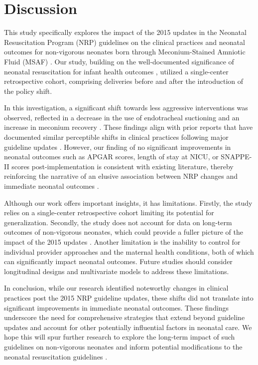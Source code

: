 \documentclass[11pt]{article}
\begin{document}
\section*{Discussion}

This study specifically explores the impact of the 2015 updates in the Neonatal Resuscitation Program (NRP) guidelines on the clinical practices and neonatal outcomes for non-vigorous neonates born through Meconium-Stained Amniotic Fluid (MSAF) \cite{Wyckoff2015Part1N}. Our study, building on the well-documented significance of neonatal resuscitation for infant health outcomes \cite{Boyle2015NeonatalOA, Stoll2010NeonatalOO}, utilized a single-center retrospective cohort, comprising deliveries before and after the introduction of the policy shift. 

In this investigation, a significant shift towards less aggressive interventions was observed, reflected in a decrease in the use of endotracheal suctioning and an increase in meconium recovery \cite{Hishikawa2016RespiratorySA, Gulczyska2015PRACTICALAO}. These findings align with prior reports that have documented similar perceptible shifts in clinical practices following major guideline updates \cite{Goeral2014PO0394IA, Study2018EpidemiologyCS}. However, our finding of no significant improvements in neonatal outcomes such as APGAR scores, length of stay at NICU, or SNAPPE-II scores post-implementation \cite{Wolff2009ScreeningFS, Jansen2015PhysicalAI} is consistent with existing literature, thereby reinforcing the narrative of an elusive association between NRP changes and immediate neonatal outcomes \cite{Menai2017AccelerometerAM, Westerterp2003ImpactsOV}.

Although our work offers important insights, it has limitations. Firstly, the study relies on a single-center retrospective cohort limiting its potential for generalization. Secondly, the study does not account for data on long-term outcomes of non-vigorous neonates, which could provide a fuller picture of the impact of the 2015 updates \cite{Gulczyska2015PRACTICALAO}. Another limitation is the inability to control for individual provider approaches and the maternal health conditions, both of which can significantly impact neonatal outcomes. Future studies should consider longitudinal designs and multivariate models to address these limitations.

In conclusion, while our research identified noteworthy changes in clinical practices post the 2015 NRP guideline updates, these shifts did not translate into significant improvements in immediate neonatal outcomes. These findings underscore the need for comprehensive strategies that extend beyond guideline updates and account for other potentially influential factors in neonatal care. We hope this will spur further research to explore the long-term impact of such guidelines on non-vigorous neonates and inform potential modifications to the neonatal resuscitation guidelines \cite{Hishikawa2016RespiratorySA}.
\end{document}
